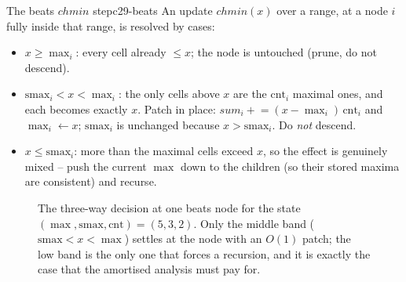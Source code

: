 \begin{definition}{The beats \(\mathit{chmin}\) step}{c29-beats}
An update \(\mathit{chmin}(x)\) over a range, at a node \(i\) fully inside that
range, is resolved by cases:
\begin{itemize}[nosep]
  \item \(x \ge \max_i\): every cell already \(\le x\); the node is untouched
        (prune, do not descend).
  \item \(\mathrm{smax}_i < x < \max_i\): the only cells above \(x\) are the
        \(\mathrm{cnt}_i\) maximal ones, and each becomes exactly \(x\).  Patch in
        place: \(\mathit{sum}_i \mathrel{+}= (x-\max_i)\,\mathrm{cnt}_i\) and
        \(\max_i \leftarrow x\); \(\mathrm{smax}_i\) is unchanged because
        \(x>\mathrm{smax}_i\).  Do \emph{not} descend.
  \item \(x \le \mathrm{smax}_i\): more than the maximal cells exceed \(x\), so the
        effect is genuinely mixed -- push the current \(\max\) down to the children
        (so their stored maxima are consistent) and recurse.
\end{itemize}
\end{definition}

\begin{figure}[H]
\centering
{}
\caption{The three-way decision at one beats node for the state
\((\max,\mathrm{smax},\mathrm{cnt})=(5,3,2)\).  Only the middle band
(\(\mathrm{smax}<x<\max\)) settles at the node with an \(O(1)\) patch; the low
band is the only one that forces a recursion, and it is exactly the case that the
amortised analysis must pay for.}
\label{fig:c29-beats}
\end{figure}

